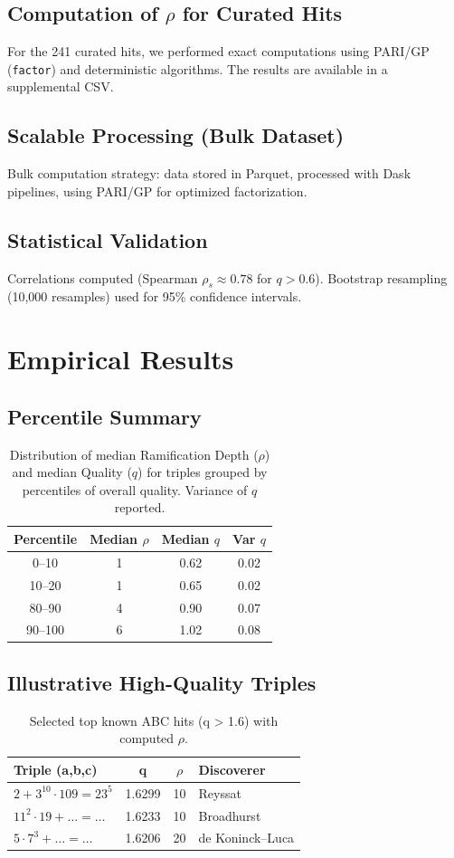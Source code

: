 \documentclass[11pt,a4paper]{article}
\begin{document}
\subsection{Computation of \(\rho\) for Curated Hits}
For the 241 curated hits, we performed exact computations using PARI/GP (\texttt{factor}) and deterministic algorithms. The results are available in a supplemental CSV.
\subsection{Scalable Processing (Bulk Dataset)}
Bulk computation strategy: data stored in Parquet, processed with Dask pipelines, using PARI/GP for optimized factorization.
\subsection{Statistical Validation}
Correlations computed (Spearman $\rho_s\approx0.78$ for $q>0.6$). Bootstrap resampling (10,000 resamples) used for 95\% confidence intervals.

\section{Empirical Results}
\subsection{Percentile Summary}
\begin{table}[h!]
\centering
\caption{Distribution of median Ramification Depth ($\rho$) and median Quality ($q$) for triples grouped by percentiles of overall quality. Variance of $q$ reported.}
\begin{tabular}{c c c c}
\toprule
Percentile & Median $\rho$ & Median $q$ & Var $q$ \\
\midrule
0--10 & 1 & 0.62 & 0.02 \\
10--20 & 1 & 0.65 & 0.02 \\
80--90 & 4 & 0.90 & 0.07 \\
90--100 & 6 & 1.02 & 0.08 \\
\bottomrule
\end{tabular}
\label{tab:percentiles}
\end{table}
\subsection{Illustrative High-Quality Triples}
\begin{table}[h!]
\centering
\caption{Selected top known ABC hits (q > 1.6) with computed $\rho$.}
\begin{tabular}{l c c l}
\toprule
Triple (a,b,c) & q & $\rho$ & Discoverer \\
\midrule
$2 + 3^{10}\cdot 109 = 23^5$ & 1.6299 & 10 & Reyssat \\
$11^2\cdot 19 + \dots = \dots$ & 1.6233 & 10 & Broadhurst \\
$5\cdot7^3 + \dots = \dots$ & 1.6206 & 20 & de Koninck--Luca \\
\bottomrule
\end{tabular}
\label{tab:top-hits}
\end{table}
\end{document}
